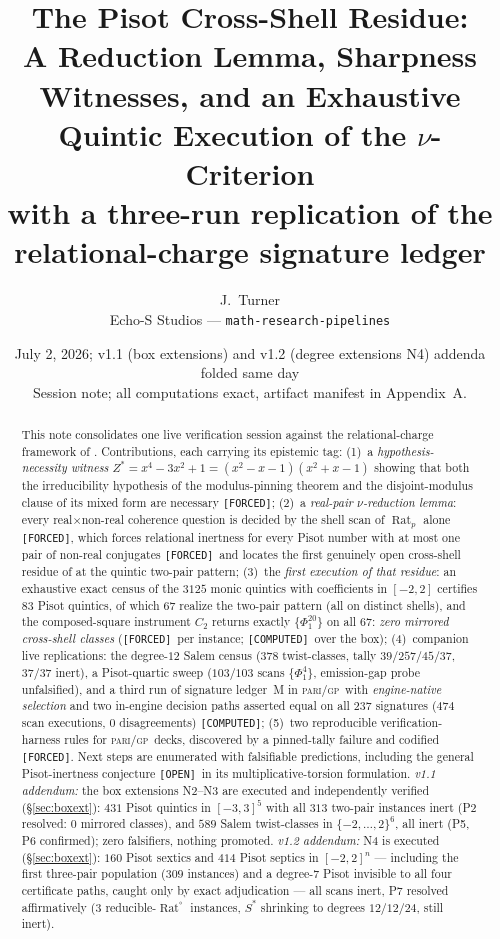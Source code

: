 \documentclass[11pt]{article}
\title{\textbf{The Pisot Cross-Shell Residue:}\\
A Reduction Lemma, Sharpness Witnesses, and an Exhaustive Quintic Execution of the $\nu$-Criterion\\
\large with a three-run replication of the relational-charge signature ledger}
\author{J.~Turner\\ \small Echo-S Studios --- \texttt{math-research-pipelines}}
\date{July 2, 2026; v1.1 (box extensions) and v1.2 (degree extensions N4) addenda folded same day \\ \small Session note; all computations exact, artifact manifest in Appendix~A.}
\newcommand{\F}{\textnormal{\texttt{[FORCED]}}}
\newcommand{\C}{\textnormal{\texttt{[COMPUTED]}}}
\newcommand{\Op}{\textnormal{\texttt{[OPEN]}}}
\newcommand{\Rat}{\operatorname{Rat}}
\newcommand{\gp}{\textsc{pari/gp}}
\theoremstyle{definition}
\begin{document}
\maketitle

\begin{abstract}
This note consolidates one live verification session against the relational-charge
framework of \cite{relcharge}. Contributions, each carrying its epistemic tag:
(1)~a \emph{hypothesis-necessity witness} $Z^{*}=x^4-3x^2+1=(x^2-x-1)(x^2+x-1)$
showing that both the irreducibility hypothesis of the modulus-pinning theorem and
the disjoint-modulus clause of its mixed form are necessary \F;
(2)~a \emph{real-pair $\nu$-reduction lemma}: every real$\times$non-real coherence
question is decided by the shell scan of $\Rat_p$ alone \F, which forces relational
inertness for every Pisot number with at most one pair of non-real conjugates \F\
and locates the first genuinely open cross-shell residue of \cite[Cor.~7.16]{relcharge}
at the quintic two-pair pattern;
(3)~the \emph{first execution of that residue}: an exhaustive exact census of the
$3125$ monic quintics with coefficients in $[-2,2]$ certifies $83$ Pisot quintics,
of which $67$ realize the two-pair pattern (all on distinct shells), and the
composed-square instrument $C_2$ returns exactly $\{\Phi_1^{20}\}$ on all $67$:
\emph{zero mirrored cross-shell classes} (\F\ per instance; \C\ over the box);
(4)~companion live replications: the degree-$12$ Salem census
($378$ twist-classes, tally $39/257/45/37$, $37/37$ inert), a Pisot-quartic sweep
($103/103$ scans $\{\Phi_1^4\}$, emission-gap probe unfalsified), and a third run
of signature ledger~M in \gp\ with \emph{engine-native selection} and two
in-engine decision paths asserted equal on all $237$ signatures ($474$ scan
executions, $0$ disagreements) \C;
(5)~two reproducible verification-harness rules for \gp\ decks, discovered by a
pinned-tally failure and codified \F.
Next steps are enumerated with falsifiable predictions, including the general
Pisot-inertness conjecture \Op\ in its multiplicative-torsion formulation.
\emph{v1.1 addendum:} the box extensions N2--N3 are executed and independently
verified (\S\ref{sec:boxext}): $431$ Pisot quintics in $[-3,3]^5$ with all
$313$ two-pair instances inert (P2 resolved: $0$ mirrored classes), and $589$
Salem twist-classes in $\{-2,\dots,2\}^6$, all inert (P5, P6 confirmed); zero
falsifiers, nothing promoted. \emph{v1.2 addendum:} N4 is executed
(\S\ref{sec:boxext}): $160$ Pisot sextics and $414$ Pisot septics in
$[-2,2]^n$ --- including the first three-pair population ($309$ instances)
and a degree-$7$ Pisot invisible to all four certificate paths, caught only
by exact adjudication --- all scans inert, P7 resolved affirmatively
($3$ reducible-$\Rat^{\circ}$ instances, $S^{*}$ shrinking to degrees
$12/12/24$, still inert).
\end{abstract}
\end{document}
